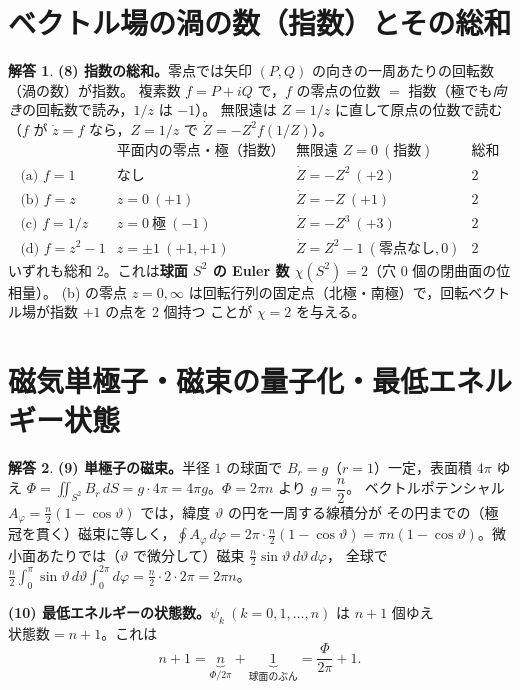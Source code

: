 \documentclass[dvipdfmx, uplatex]{jsarticle}
\theoremstyle{definition}
\newtheorem*{sol}{解答}
\begin{document}
\section{ベクトル場の渦の数（指数）とその総和}
\begin{sol}
\textbf{(8) 指数の総和。}零点では矢印 $(P,Q)$ の向きの一周あたりの回転数（渦の数）が指数。
複素数 $f=P+iQ$ で，$f$ の零点の位数 $=$ 指数（極でも\emph{向き}の回転数で読み，$1/z$ は $-1$）。
無限遠は $Z=1/z$ に直して原点の位数で読む（$f$ が $\dot z=f$ なら，$Z=1/z$ で $\dot Z=-Z^2 f(1/Z)$）。
\[
\renewcommand{\arraystretch}{1.3}
\begin{array}{c|c|c|c}
& \text{平面内の零点・極（指数）} & \text{無限遠 }Z=0\ (\text{指数}) & \text{総和}\\\hline
\text{(a) }f=1 & \text{なし} & \dot Z=-Z^2\ (+2) & \boxed{2}\\
\text{(b) }f=z & z=0\ (+1) & \dot Z=-Z\ (+1) & \boxed{2}\\
\text{(c) }f=1/z & z=0\ \text{極}\ (-1) & \dot Z=-Z^3\ (+3) & \boxed{2}\\
\text{(d) }f=z^2-1 & z=\pm1\ (+1,+1) & \dot Z=Z^2-1\ (\text{零点なし},0) & \boxed{2}
\end{array}
\]
いずれも総和 $\boxed{2}$。これは\textbf{球面 $S^2$ の Euler 数 $\chi(S^2)=2$}（穴 $0$ 個の閉曲面の位相量）。
(b) の零点 $z=0,\infty$ は回転行列の固定点（北極・南極）で，回転ベクトル場が指数 $+1$ の点を 2 個持つ
ことが $\chi=2$ を与える。
\end{sol}

\section{磁気単極子・磁束の量子化・最低エネルギー状態}
\begin{sol}
\textbf{(9) 単極子の磁束。}半径 $1$ の球面で $B_r=g$（$r=1$）一定，表面積 $4\pi$ ゆえ
$\Phi=\iint_{S^2}B_r\,dS=g\cdot4\pi=\boxed{4\pi g}$。$\Phi=2\pi n$ より $\boxed{g=\dfrac n2}$。
ベクトルポテンシャル $A_\varphi=\tfrac n2(1-\cos\vartheta)$ では，緯度 $\vartheta$ の円を一周する線積分が
その円までの（極冠を貫く）磁束に等しく，$\displaystyle\oint A_\varphi\,d\varphi=2\pi\cdot\tfrac n2(1-\cos\vartheta)
=\pi n(1-\cos\vartheta)$。微小面あたりでは（$\vartheta$ で微分して）磁束 $\tfrac n2\sin\vartheta\,d\vartheta\,d\varphi$，
全球で $\tfrac n2\!\int_0^\pi\!\sin\vartheta\,d\vartheta\!\int_0^{2\pi}\!d\varphi=\tfrac n2\cdot2\cdot2\pi=\boxed{2\pi n}$。

\par\smallskip
\textbf{(10) 最低エネルギーの状態数。}$\psi_k\ (k=0,1,\dots,n)$ は $n+1$ 個ゆえ
$\boxed{\text{状態数}=n+1}$。これは
\[
    n+1=\underbrace{n}_{\Phi/2\pi}+\underbrace{1}_{\text{球面のぶん}}
    =\boxed{\frac{\Phi}{2\pi}+1}.
\]
\end{sol}
\end{document}
